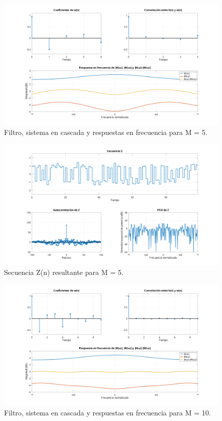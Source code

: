 \begin{figure}[!hbp]
	\centering
	\includegraphics[width=1\linewidth,trim=4cm 0 4cm 0,clip]{img/ej4_5_coef.pdf}
	\caption{Filtro, sistema en cascada y respuestas en frecuencia para M = 5.}
	\label{fig:ej4_5_coef}
\end{figure}

\begin{figure}[!hbp]
	\centering
	\includegraphics[width=1\linewidth,trim=4cm 0 4cm 0,clip]{img/ej4_5_z.pdf}
	\caption{Secuencia Z(n) resultante para M = 5.}
	\label{fig:ej4_5_z}
\end{figure}

\begin{figure}[!hbp]
	\centering
	\includegraphics[width=1\linewidth,trim=4cm 0 4cm 0,clip]{img/ej4_10_coef.pdf}
	\caption{Filtro, sistema en cascada y respuestas en frecuencia para M = 10.}
	\label{fig:ej4_10_coef}
\end{figure}


